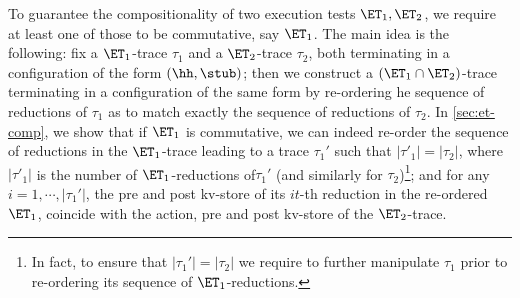 To guarantee the compositionality of two execution tests $\ET_1, \ET_2$, we 
require at least one of those to be commutative, say $\ET_1$. The main idea 
is the following: fix a $\ET_1$-trace $\tau_1$ and a $\ET_2$-trace $\tau_2$, both terminating in a configuration 
of the form $(\hh, \stub)$; then we construct a $(\ET_1 \cap \ET_2)$-trace terminating 
in a configuration of the same form by re-ordering he sequence of 
reductions of $\tau_1$ as to match exactly the sequence of 
reductions of $\tau_2$. 
In \cref{sec:et-comp}, we show that if $\ET_1$ is commutative, 
we can indeed re-order the sequence of reductions in the 
$\ET_1$-trace leading to a trace $\tau_1'$ such that $\lvert \tau'_1 \rvert = \lvert \tau_2 \rvert$, 
where $\vert \tau'_1 \rvert$ is the 
number of $\ET_1$-reductions of$\tau_1'$ (and similarly for $\tau_2$)\footnote{In fact, 
to ensure that $\lvert \tau_1' \rvert = \lvert \tau_2 \rvert$ we require to further manipulate 
$\tau_1$ prior to re-ordering its sequence of $\ET_1$-reductions.}; and for any 
$i=1,\cdots, \lvert \tau_1'\rvert$, the pre and post kv-store of its
$it$-th reduction in the re-ordered $\ET_1$, coincide with the action, pre and post kv-store 
of the $\ET_2$-trace.

